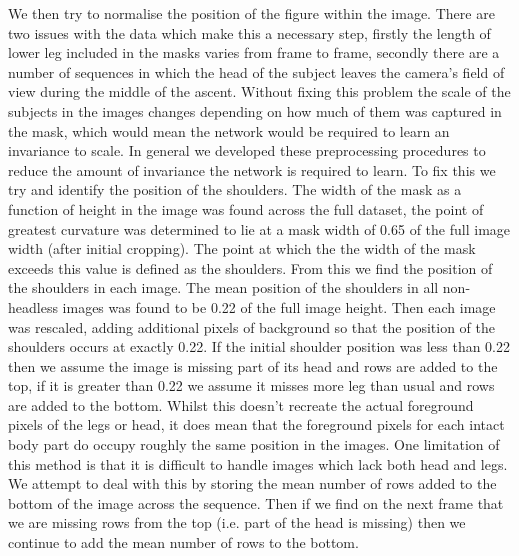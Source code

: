 \documentclass[11pt]{article} %
\begin{document}
We then try to normalise the position of the figure within the image. There are two issues with the data which make this a necessary step, firstly the length of lower leg included in the masks varies from frame to frame, secondly there are a number of sequences in which the head of the subject leaves the camera's field of view during the middle of the ascent. Without fixing this problem the scale of the subjects in the images changes depending on how much of them was captured in the mask, which would mean the network would be required to learn an invariance to scale. In general we developed these preprocessing procedures to reduce the amount of invariance the network is required to learn. To fix this we try and identify the position of the shoulders. The width of the mask as a function of height in the image was found across the full dataset, the point of greatest curvature was determined to lie at a mask width of 0.65 of the full image width (after initial cropping). The point at which the the width of the mask exceeds this value is defined as the shoulders. From this we find the position of the shoulders in each image. The mean position of the shoulders in all non-headless images was found to be 0.22 of the full image height. Then each image was rescaled, adding additional pixels of background so that the position of the shoulders occurs at exactly 0.22. If the initial shoulder position was less than 0.22 then we assume the image is missing part of its head and rows are added to the top, if it is greater than 0.22 we assume it misses more leg than usual and rows are added to the bottom. Whilst this doesn't recreate the actual foreground pixels of the legs or head, it does mean that the foreground pixels for each intact body part do occupy roughly the same position in the images. One limitation of this method is that it is difficult to handle images which lack both head and legs. We attempt to deal with this by storing the mean number of rows added to the bottom of the image across the sequence. Then if we find on the next frame that we are missing rows from the top (i.e. part of the head is missing) then we continue to add the mean number of rows to the bottom.
\end{document}
